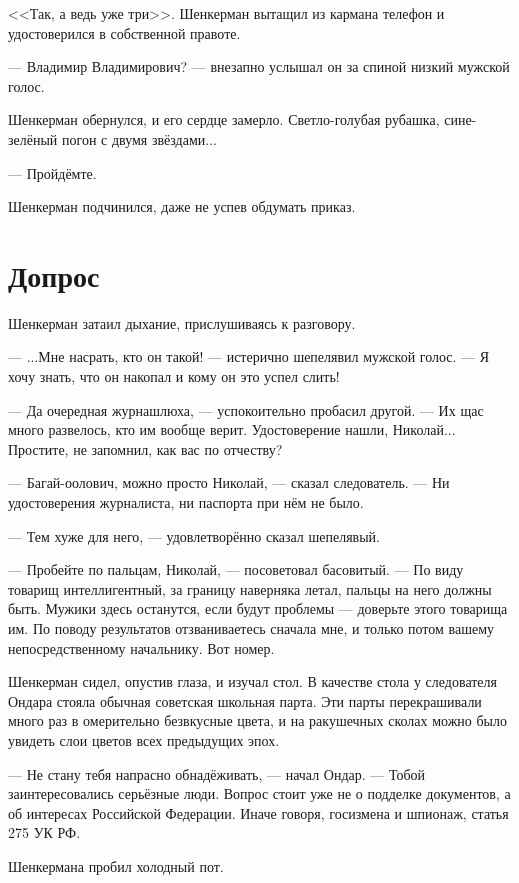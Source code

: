 \documentclass[a4paper,10pt,fleqn]{book}\usepackage{polyglossia}\setdefaultlanguage{english}\setotherlanguage{russian}\defaultfontfeatures{Ligatures=TeX,Mapping=tex-text} \usepackage{xcolor}\definecolor{lightgray}{HTML}{bbbbbb}\color{lightgray}\newcommand{\ml}[3]{\textcolor{black}{#3}}
\newcommand{\asterism}{\vspace{1em}{\centering\Large\bfseries$\ast~\ast~\ast$\par}\vspace{1em}}
\begin{document}
<<Так, а ведь уже три>>.
Шенкерман вытащил из кармана телефон и удостоверился в собственной правоте.

--- Владимир Владимирович? --- внезапно услышал он за спиной низкий мужской голос.

Шенкерман обернулся, и его сердце замерло.
Светло-голубая рубашка, сине-зелёный погон с двумя звёздами...

--- Пройдёмте.

Шенкерман подчинился, даже не успев обдумать приказ.

\section{Допрос}

Шенкерман затаил дыхание, прислушиваясь к разговору.

--- ...Мне насрать, кто он такой! --- истерично шепелявил мужской голос.
--- Я хочу знать, что он накопал и кому он это успел слить!

--- Да очередная журнашлюха, --- успокоительно пробасил другой.
--- Их щас много развелось, кто им вообще верит.
Удостоверение нашли, Николай...
Простите, не запомнил, как вас по отчеству?

--- Багай-оолович, можно просто Николай, --- сказал следователь.
--- Ни удостоверения журналиста, ни паспорта при нём не было.

--- Тем хуже для него, --- удовлетворённо сказал шепелявый.

--- Пробейте по пальцам, Николай, --- посоветовал басовитый.
--- По виду товарищ интеллигентный, за границу наверняка летал, пальцы на него должны быть.
Мужики здесь останутся, если будут проблемы --- доверьте этого товарища им.
По поводу результатов отзваниваетесь сначала мне, и только потом вашему непосредственному начальнику.
Вот номер.

\asterism

Шенкерман сидел, опустив глаза, и изучал стол.
В качестве стола у следователя Ондара стояла обычная советская школьная парта.
Эти парты перекрашивали много раз в омерительно безвкусные цвета, и на ракушечных сколах можно было увидеть слои цветов всех предыдущих эпох.

--- Не стану тебя напрасно обнадёживать, --- начал Ондар.
--- Тобой заинтересовались серьёзные люди.
Вопрос стоит уже не о подделке документов, а об интересах Российской Федерации.
Иначе говоря, госизмена и шпионаж, статья 275 УК РФ.

Шенкермана пробил холодный пот.
\end{document}
